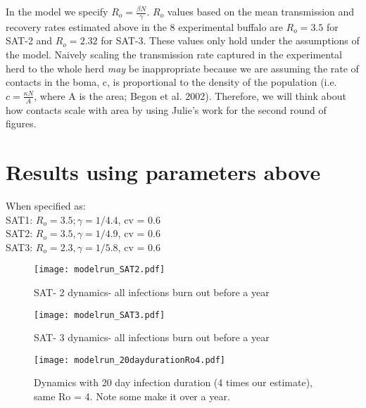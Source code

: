 \documentclass[letterpaper,12pt]{article}
\begin{document}
In the model we specify $R_o = \frac{\beta N}{\gamma}$.  
$R_o$ values based on the mean transmission and recovery rates estimated above in the 8 experimental buffalo are $R_o = 3.5$ for SAT-2 and $R_o = 2.32$ for SAT-3.  
These values only hold under the assumptions of the model. 
Naively scaling the transmission rate captured in the experimental herd to the whole herd \textit{may} be inappropriate because we are assuming the rate of contacts in the boma, c, is proportional to the density of the population (i.e. $c = \frac{\kappa N}{A}$, where A is the area; Begon et al. 2002).
Therefore, we will think about how contacts scale with area by using Julie's work for the second round of figures.  

\section{Results using parameters above}
When specified as: \\
SAT1: $R_o = 3.5; \gamma= 1/4.4$, cv = 0.6 \\
SAT2: $R_o = 3.5, \gamma = 1/4.9$, cv = 0.6\\
SAT3: $R_o = 2.3, \gamma = 1/5.8$, cv = 0.6 \\


\begin{figure}[h]
\begin{center}
\texttt{[image: modelrun\_SAT2.pdf]}
\caption{SAT- 2 dynamics- all infections burn out before a year}
\end{center}
\end{figure}

\begin{figure}[h]
\begin{center}
\texttt{[image: modelrun\_SAT3.pdf]}
\caption{SAT- 3 dynamics- all infections burn out before a year}
\end{center}
\end{figure}

\begin{figure}[h]
\begin{center}
\texttt{[image: modelrun\_20daydurationRo4.pdf]}
\caption{Dynamics with 20 day infection duration (4 times our estimate), same Ro = 4.  Note some make it over a year.}
\end{center}
\end{figure}

\end{document}

